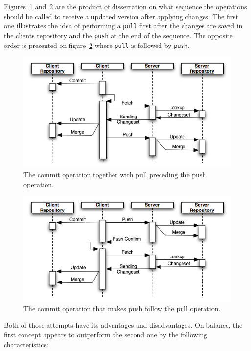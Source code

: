 Figures~\ref{fig:seq_commit} and~\ref{fig:seq_commit2} are the product of dissertation on what sequence the operations should be called to receive a updated version after applying changes. The first one illustrates the idea of performing a \texttt{pull} first after the changes are saved in the clients repository and the \texttt{push} at the end of the sequence. The opposite order is presented on figure~\ref{fig:seq_commit2} where \texttt{pull} is followed by \texttt{push}. 
\begin{figure}[ht]
\begin{center}
\includegraphics[scale=0.6]{charts/seq_commit.png}
\caption{The commit operation together with pull preceding the push operation.}
\label{fig:seq_commit}
\end{center}
\end{figure}
\begin{figure}[ht]
\begin{center}
\includegraphics[scale=0.6]{charts/seq_commit2.png}
\caption{The commit operation that makes push follow the pull operation.}
\label{fig:seq_commit2}
\end{center}
\end{figure}
\newline Both of those attempts have its advantages and disadvantages. On balance, the first concept appears to outperform the second one by the following characteristics:
